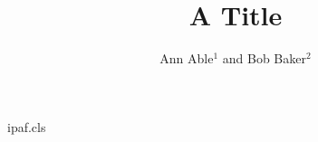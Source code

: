 \begin{filecontents*}[overwrite]{ipaf.cls}
\renewcommand{\author}[1]{{\raggedright #1\par}}
\newcommand{\affil}[1]{{\small\raggedright #1}}
\end{filecontents*}
\documentclass{ipaf}

\title{A Title}
\author{Ann Able$^{1}$ and Bob Baker$^{2}$}



\maketitle
Text.

